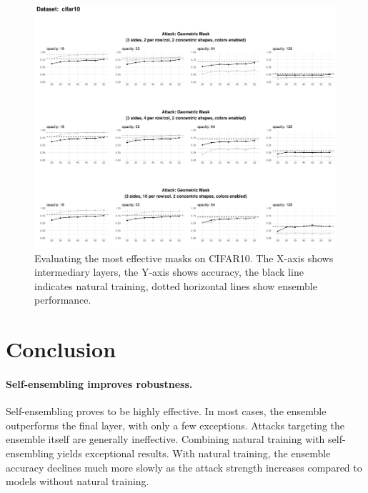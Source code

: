 \documentclass[a4paper, oneside]{discothesis}
\begin{document}

\begin{figure}
	\centering
	\includegraphics[width=1\columnwidth,keepaspectratio]{figures/self_ensemble_mask_final_cifar10.pdf}
	\caption{Evaluating the most effective masks on CIFAR10. The X-axis shows intermediary layers, the Y-axis shows accuracy, the black line indicates natural training, dotted horizontal lines show ensemble performance.}
	\label{fig:mask-effective}
\end{figure}






\section{Conclusion}

\paragraph{Self-ensembling improves robustness.}

Self-ensembling proves to be highly effective. In most cases, the ensemble outperforms the final layer, with only a few exceptions. Attacks targeting the ensemble itself are generally ineffective. Combining natural training with self-ensembling yields exceptional results. With natural training, the ensemble accuracy declines much more slowly as the attack strength increases compared to models without natural training.
\end{document}
